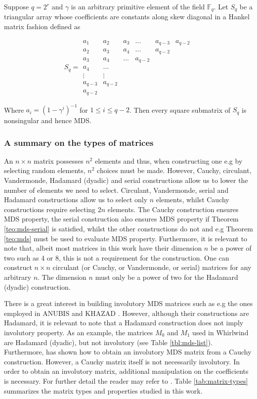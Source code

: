 \begin{theorem}
Suppose $q = 2^r$ and $\gamma$ is an arbitrary primitive element of the field $\mathbb{F}_q$. Let $S_q$ be a triangular array whose coefficients are constants along skew diagonal in a Hankel matrix fashion defined as

$$
S_q = 
\begin{matrix}
a_1 & a_2 & a_3 & ... & a_{q-3} & a_{q-2} \\
a_2 & a_3 & a_4 & ... & a_{q-2} \\
a_3 & a_4 & ... & a_{q-2} \\
a_4 & ... \\
\vdots & \vdots \\
a_{q-3} & a_{q-2} \\
a_{q-2}
\end{matrix}
$$

Where $a_i = (1 - \gamma^i)^{-1}$ for $1 \leq i \leq q - 2$. Then every square submatrix of $S_q$ is nonsingular and hence MDS.
\end{theorem}

\subsubsection{A summary on the types of matrices}
An $n\times n$ matrix possesses $n^2$ elements and thus, when constructing one e.g by selecting random elements, $n^2$ choices must be made. However, Cauchy, circulant, Vandermonde, Hadamard (dyadic) and serial constructions allow us to lower the number of elements we need to select. Circulant, Vandermonde, serial and Hadamard constructions allow us to select only $n$ elements, whilst Cauchy constructions require selecting $2n$ elements. The Cauchy construction ensures MDS property, the serial construction also ensures MDS property if Theorem \ref{teo:mds-serial} is satisfied, whilst the other constructions do not and e.g Theorem \ref{teo:mds} must be used to evaluate MDS property. Furthermore, it is relevant to note that, albeit most matrices in this work have their dimension $n$ be a power of two such as 4 or 8, this is not a requirement for the construction. One can construct $n \times n$ circulant (or Cauchy, or Vandermonde, or serial) matrices for any arbitrary $n$. The dimension $n$ must only be a power of two for the Hadamard (dyadic) construction.

There is a great interest in building involutory MDS matrices such as e.g the ones employed in ANUBIS \cite{ANUBIS2000} and KHAZAD \cite{KHAZAD2000}. However, although their constructions are Hadamard, it is relevant to note that a Hadamard construction does not imply involutory property. As an example, the matrices $M_0$ and $M_1$ used in Whirlwind \cite{Whirlwind2010} are Hadamard (dyadic), but not involutory (see Table \ref{tbl:mds-list}). Furthermore, \cite{Youssef1997} has shown how to obtain an involutory MDS matrix from a Cauchy construction. However, a Cauchy matrix itself is not necessarily involutory. In order to obtain an involutory matrix, additional manipulation on the coefficients is necessary. For further detail the reader may refer to \cite{Youssef1997}. Table \ref{tab:matrix-types} summarizes the matrix types and properties studied in this work.

